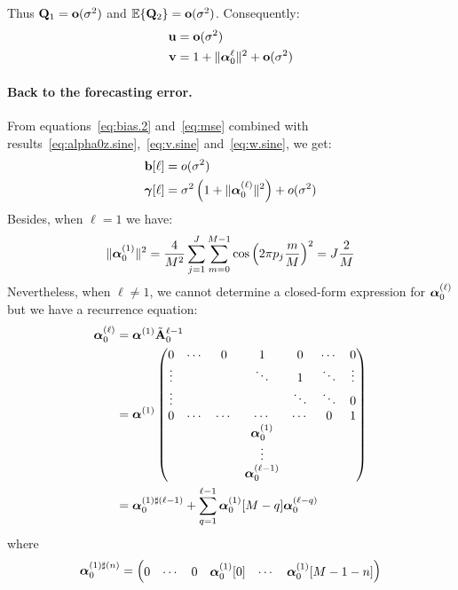 Thus ${\mathbf Q}_1={\mathbf o}(\sigma^2)$ and ${\mathbb E}\{{\mathbf Q}_2\}={\mathbf o}(\sigma^2)$. Consequently:
\begin{align}
\label{eq:v.sine}
{\mathbf u} &= {\mathbf o}(\sigma^2) \\
\label{eq:w.sine}
{\mathbf v} &= 1+\|\boldsymbol{\alpha}_0^{\ell}\|^2+{\mathbf o}(\sigma^2)
\end{align}

\paragraph{Back to the forecasting error.}
From equations~\eqref{eq:bias.2} and~\eqref{eq:mse} combined with results~\eqref{eq:alpha0z.sine},~\eqref{eq:v.sine} and~\eqref{eq:w.sine}, we get:
\begin{align*}
{\mathbf b}[\ell] &= o(\sigma^2) \\
\boldsymbol{\gamma}[\ell] &= \sigma^2\left(1+\|\boldsymbol{\alpha}_0^{(\ell)}\|^2\right) + o(\sigma^2)
\end{align*}
Besides, when $\ell=1$ we have:
\begin{equation*}
\|\boldsymbol{\alpha}_0^{(1)}\|^2 = \dfrac4{M^2}\sum_{j=1}^J\sum_{m=0}^{M-1}\cos\left(2\pi p_j\dfrac{m}{M}\right)^2 = J\dfrac2M
\end{equation*}
Nevertheless, when $\ell\neq 1$, we cannot determine a closed-form expression for $\boldsymbol{\alpha}_0^{(\ell)}$ but we have a recurrence equation:
\begin{align*}
\boldsymbol{\alpha}_0^{(\ell)} &= \boldsymbol{\alpha}^{(1)}\tilde{{\mathbf A}}_0^{\ell-1} \\
&= \boldsymbol{\alpha}^{(1)}
\begin{pmatrix}
0       & \cdots & 0      & 1      & 0      & \cdots & 0 \\
\vdots  &        &        & \ddots & 1      & \ddots & \vdots \\
\vdots  &        &        &        & \ddots & \ddots & 0 \\
0       & \cdots & \cdots & \cdots & \cdots &    0   & 1 \\
        &        &        & \boldsymbol{\alpha}_0^{(1)} &        &        &   \\
        &        &        & \vdots &        &        &   \\
        &        &        & \boldsymbol{\alpha}_0^{(\ell-1)} &        &        &   
\end{pmatrix} \\
&=\boldsymbol{\alpha}_0^{(1)\sharp(\ell -1)} + \sum_{q=1}^{\ell-1}\boldsymbol{\alpha}_0^{(1)}[M-q]\boldsymbol{\alpha}_0^{(\ell-q)}
\end{align*}
where
\begin{equation*}
\boldsymbol{\alpha}_0^{(1)\sharp(n)} = 
\begin{pmatrix}
0 & \cdots & 0 & \boldsymbol{\alpha}_0^{(1)}[0] & \cdots & \boldsymbol{\alpha}_0^{(1)}[M-1-n]
\end{pmatrix}
\end{equation*}
